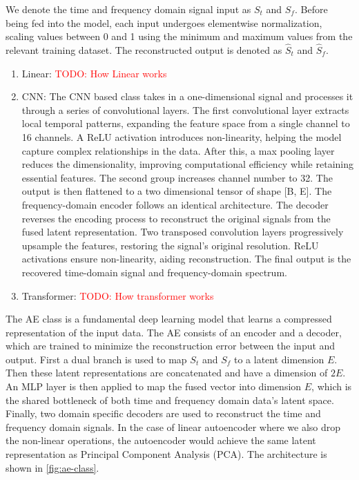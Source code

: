 \documentclass[12pt]{article}
\newcommand{\todo}[1]{\textcolor{red}{TODO: #1}}
\begin{document}
We denote the time and frequency domain signal input as $S_{t}$ and $S_f$. Before being fed into the model, each input undergoes elementwise normalization, scaling values between 0 and 1 using the minimum and maximum values from the relevant training dataset. The reconstructed output is denoted as $\hat{S}_{t}$ and $\hat{S}_{f}$.

\begin{enumerate}
    \item Linear: \todo{How Linear works}
    \item CNN: The CNN based class takes in a one-dimensional signal and processes it through a series of convolutional layers. The first convolutional layer extracts local temporal patterns, expanding the feature space from a single channel to 16 channels. A ReLU activation introduces non-linearity, helping the model capture complex relationships in the data. After this, a max pooling layer reduces the dimensionality, improving computational efficiency while retaining essential features. The second group increases channel number to 32. The output is then flattened to a two dimensional tensor of shape [B, E]. The frequency-domain encoder follows an identical architecture. The decoder reverses the encoding process to reconstruct the original signals from the fused latent representation. Two transposed convolution layers progressively upsample the features, restoring the signal's original resolution. ReLU activations ensure non-linearity, aiding reconstruction. The final output is the recovered time-domain signal and frequency-domain spectrum.
    \item Transformer: \todo{How transformer works}
\end{enumerate}


The AE class is a fundamental deep learning model that learns a compressed representation of the input data. The AE consists of an encoder and a decoder, which are trained to minimize the reconstruction error between the input and output.  First a dual branch is used to map $S_t$ and $S_f$ to a latent dimension $E$. Then these latent representations are concatenated and have a dimension of $2E$. An MLP layer is then applied to map the fused vector into dimension $E$, which is the shared bottleneck of both time and frequency domain data's latent space. Finally, two domain specific decoders are used to reconstruct the time and frequency domain signals. In the case of linear autoencoder where we also drop the non-linear operations, the autoencoder would achieve the same latent representation as Principal Component Analysis (PCA). The architecture is shown in \autoref{fig:ae-class}.
\end{document}
